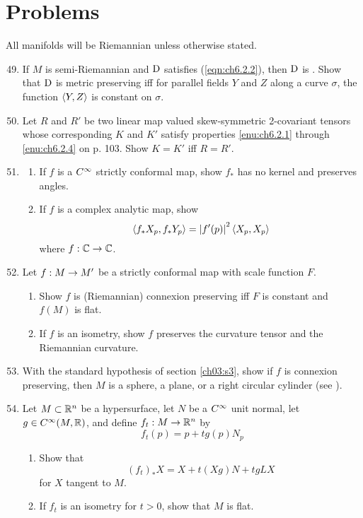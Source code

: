 \documentclass[../main]{subfiles}
\begin{document}
\section*{Problems}
All manifolds will be Riemannian unless otherwise stated.
\begin{enumerate}
\setcounter{enumi}{48}

\item\label{pro:49} If $M$ is semi-Riemannian and $\mathrm{D}$ satisfies (\ref{eqn:ch6.2.2}), then $\mathrm{D}$ is . Show that $\mathrm{D}$ is metric preserving iff for parallel fields $Y$ and $Z$ along a curve $\sigma$, the function $\left\langle Y,Z\right\rangle$ is constant on $\sigma$.

\item\label{pro:50} Let $R$ and $R'$ be two linear map valued skew-symmetric 2-covariant tensors whose corresponding $K$ and $K'$ satisfy properties \ref{enu:ch6.2.1} through \ref{enu:ch6.2.4} on p. 103. Show $K=K'$ iff $R=R'$.

\item\label{pro:51} 
\begin{enumerate}[label=(\roman*)]
    \item If $f$ is a $C^\infty$ strictly conformal map, show $f_*$ has no kernel and preserves angles.
    \item  If $f$ is a complex analytic map, show
    \[\left\langle f_*X_p,f_*Y_p\right\rangle=\left|f'(p)\right|^2\left\langle X_p,X_p\right\rangle\]
    where $f:\mathbb{C}\to\mathbb{C}$.
\end{enumerate}


\item\label{pro:52} Let $f:M\to M'$ be a strictly conformal map with scale function $F$.
\begin{enumerate}[label = (\roman*)]
    \item Show $f$ is (Riemannian) connexion preserving iff $F$ is constant and $f(M)$ is flat.
    \item If $f$ is an isometry, show $f$ preserves the curvature tensor and the Riemannian curvature.
\end{enumerate}

\item\label{pro:53} With the standard hypothesis of section \ref{ch03:s3}, show if $f$ is connexion preserving, then $M$ is a sphere, a plane, or a right circular cylinder (see  \cite{hicks1963submanifolds}).

\item\label{pro:54} Let $M\subset\mathbb{R}^n$ be a hypersurface, let $N$ be a $C^\infty$ unit normal, let $g\in C^\infty(M,\mathbb{R})$, and define $f_t:M\to\mathbb{R}^n$ by
\[f_t(p)=p+tg(p)N_p\]
\begin{enumerate}
    \item Show that
    \[(f_t)_*X = X + t(Xg)N + tgLX\]
    for $X$ tangent to $M$.
    \item If $f_t$ is an isometry for $t>0$, show that $M$ is flat.
\end{enumerate}
 


\end{enumerate}
\end{document}
